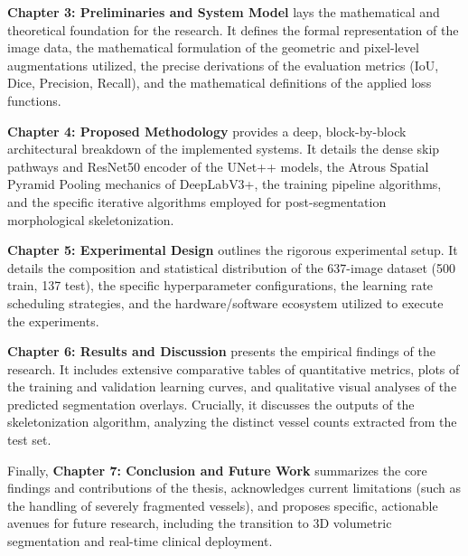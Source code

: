 \textbf{Chapter 3: Preliminaries and System Model} lays the mathematical and theoretical foundation for the research. It defines the formal representation of the image data, the mathematical formulation of the geometric and pixel-level augmentations utilized, the precise derivations of the evaluation metrics (IoU, Dice, Precision, Recall), and the mathematical definitions of the applied loss functions.

\textbf{Chapter 4: Proposed Methodology} provides a deep, block-by-block architectural breakdown of the implemented systems. It details the dense skip pathways and ResNet50 encoder of the UNet++ models, the Atrous Spatial Pyramid Pooling mechanics of DeepLabV3+, the training pipeline algorithms, and the specific iterative algorithms employed for post-segmentation morphological skeletonization.

\textbf{Chapter 5: Experimental Design} outlines the rigorous experimental setup. It details the composition and statistical distribution of the 637-image dataset (500 train, 137 test), the specific hyperparameter configurations, the learning rate scheduling strategies, and the hardware/software ecosystem utilized to execute the experiments.

\textbf{Chapter 6: Results and Discussion} presents the empirical findings of the research. It includes extensive comparative tables of quantitative metrics, plots of the training and validation learning curves, and qualitative visual analyses of the predicted segmentation overlays. Crucially, it discusses the outputs of the skeletonization algorithm, analyzing the distinct vessel counts extracted from the test set.

Finally, \textbf{Chapter 7: Conclusion and Future Work} summarizes the core findings and contributions of the thesis, acknowledges current limitations (such as the handling of severely fragmented vessels), and proposes specific, actionable avenues for future research, including the transition to 3D volumetric segmentation and real-time clinical deployment.

